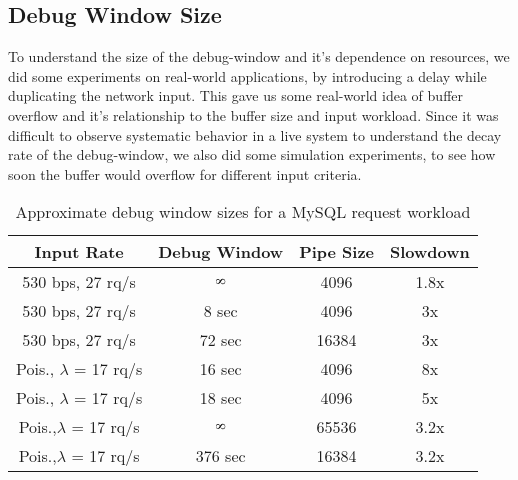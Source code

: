 \subsection{Debug Window Size}
\label{sec:parikshanTimewindowPerformance}

To understand the size of the debug-window and it's dependence on resources, we did some experiments on real-world applications, by introducing a delay while duplicating the network input.
This gave us some real-world idea of buffer overflow and it's relationship to the buffer size and input workload.
Since it was difficult to observe systematic behavior in a live system to understand the decay rate of the debug-window, we also did some simulation experiments, to see how soon the buffer would overflow for different input criteria.


\begin{table}[ht]
	\centering
	\setlength{\tabcolsep}{2pt}
	\begin{tabular}{c c c c }
		\toprule
		{\bf Input Rate} & \textbf{Debug Window} & \textbf{Pipe Size} & \textbf{Slowdown} \\ \midrule
		530 bps, 27 rq/s & $\infinity$ & 4096 & 1.8x \\ %
		530 bps, 27 rq/s & 8 sec & 4096 & 3x \\ %
		530 bps, 27 rq/s & 72 sec & 16384 & 3x \\ %
		Pois., $\lambda$ = 17 rq/s & 16 sec & 4096 & 8x \\ %
		Pois., $\lambda$ = 17 rq/s & 18 sec & 4096 & 5x \\ %
		Pois.,$\lambda$ = 17 rq/s & $\infinity$ & 65536 & 3.2x \\ %
		Pois.,$\lambda$ = 17 rq/s & 376 sec & 16384 & 3.2x \\ %
		\bottomrule
	\end{tabular}
	\caption{Approximate debug window sizes for a MySQL request workload}
	\label{table:timewindow}
\end{table}


